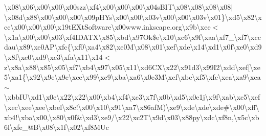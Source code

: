 \begin{DoxyCompactItemize}
\textbackslash{}x08\textbackslash{}x06\textbackslash{}x00\textbackslash{}x00\textbackslash{}x00szz\textbackslash{}xf4\textbackslash{}x00\textbackslash{}x00\textbackslash{}x00\textbackslash{}x04s\+B\+I\+T\textbackslash{}x08\textbackslash{}x08\textbackslash{}x08\textbackslash{}x08$\vert$\textbackslash{}x08d\textbackslash{}x88\textbackslash{}x00\textbackslash{}x00\textbackslash{}x00\textbackslash{}x09p\+H\+Ys\textbackslash{}x00\textbackslash{}x00\textbackslash{}x03v\textbackslash{}x00\textbackslash{}x00\textbackslash{}x03v\textbackslash{}x01\}\textbackslash{}xd5\textbackslash{}x82\textbackslash{}xcc\textbackslash{}x00\textbackslash{}x00\textbackslash{}x00\textbackslash{}x19t\+E\+Xt\+Software\textbackslash{}x00www.\+inkscape.\+org\textbackslash{}x9b\textbackslash{}xee$<$\textbackslash{}x1a\textbackslash{}x00\textbackslash{}x00\textbackslash{}x03\textbackslash{}xf4\+I\+D\+A\+T\+X\textbackslash{}x85\textbackslash{}xbd\textbackslash{}x97\+Ok\$e\textbackslash{}x10\textbackslash{}xc6\textbackslash{}x9f\textbackslash{}xaa\textbackslash{}xf7\+\_\+\textbackslash{}xf7\textbackslash{}xccdau\textbackslash{}x89\textbackslash{}xe0\+A\+P\textbackslash{}xfc\{\textbackslash{}xf0\textbackslash{}xa4\textbackslash{}x82\textbackslash{}xe0\+M\textbackslash{}x08\textbackslash{}x01\textbackslash{}xef\textbackslash{}xde\textbackslash{}x14\textbackslash{}xd1\textbackslash{}x0f\textbackslash{}xe0\textbackslash{}xd9\textbackslash{}x8f\textbackslash{}xe0\textbackslash{}xd9\textbackslash{}xc3\textbackslash{}xfa\textbackslash{}x11\textbackslash{}x14$<$z\textbackslash{}x8a\textbackslash{}x88\textquotesingle{}\textbackslash{}x85\textbackslash{}x05\textbackslash{}xf7\textbackslash{}xb4\textbackslash{}x97\textbackslash{}x05\textbackslash{}x11\textbackslash{}xd6\+C\+X\textbackslash{}x22\textbackslash{}x91d3\textbackslash{}x99\+I2\textbackslash{}xdd\textbackslash{}xef\mbox{[}\textbackslash{}xe5\textbackslash{}xa1\{\textbackslash{}x92\textbackslash{}x9e\textbackslash{}x9e\textbackslash{}xee\textbackslash{}x99\textbackslash{}xc9\textbackslash{}xba\textbackslash{}xa6\textbackslash{}x0e3\+M\textbackslash{}xcf\textbackslash{}xbc\textbackslash{}xf5\textbackslash{}xfc\textbackslash{}xea\textbackslash{}xa9\textbackslash{}xea$\sim$\textbackslash{}xbb\+I\+U\textbackslash{}xd1\textbackslash{}x0e\textbackslash{}x22\textbackslash{}x22\textbackslash{}x00\textbackslash{}xb4\textbackslash{}xf4\textbackslash{}xc3\textbackslash{}x7f\textbackslash{}x0b\textbackslash{}xd5\textbackslash{}x0e1j\textbackslash{}x9f\textbackslash{}xab\textbackslash{}xc5\textbackslash{}xef\textbackslash{}xec\textbackslash{}xee\textbackslash{}xee\textbackslash{}xbel\textbackslash{}x8c!\textbackslash{}x00\textbackslash{}x10\textbackslash{}x91\textbackslash{}xa7\textbackslash{}x86af\+M)\textbackslash{}xe9\textbackslash{}xde\textbackslash{}xde\textbackslash{}xde\#\textbackslash{}x00\textbackslash{}xff\textbackslash{}xb4!\textbackslash{}xba\textbackslash{}x00,\textbackslash{}x80\textbackslash{}x0f\&\textbackslash{}xd3\textbackslash{}xe9/\textbackslash{}x22\textbackslash{}xc2\+T\textbackslash{}x9d\textbackslash{}x03\textbackslash{}x88py\textbackslash{}xdc\textbackslash{}xf8n,\textbackslash{}x5c\textbackslash{}xb6l\textbackslash{}xfe\+\_\+@\+B\textbackslash{}x08\textbackslash{}x1f\textbackslash{}x02\textbackslash{}xf8\+M\+Uc\textbackslas
\end{DoxyCompactItemize}
